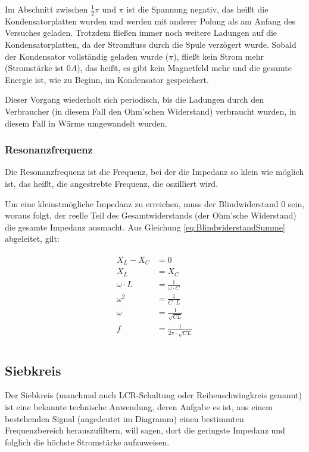 Im Abschnitt zwischen $\frac{1}{2}\pi$ und $\pi$ ist die Spannung negativ, das heißt die Kondensatorplatten wurden und werden mit anderer Polung als am Anfang des Versuches geladen. Trotzdem fließen immer noch weitere Ladungen auf die Kondensatorplatten, da der Stromfluss durch die Spule verzögert wurde. Sobald der Kondensator vollständig geladen wurde ($\pi$), fließt kein Strom mehr (Stromstärke ist $0A$), das heißt, es gibt kein Magnetfeld mehr und die gesamte Energie ist, wie zu Beginn, im Kondensator gespeichert.

Dieser Vorgang wiederholt sich periodisch, bis die Ladungen durch den Verbraucher (in diesem Fall den Ohm'schen Widerstand) verbraucht wurden, in diesem Fall in Wärme umgewandelt wurden.

\subsubsection{Resonanzfrequenz}

Die Resonanzfrequenz ist die Frequenz, bei der die Impedanz so klein wie möglich ist, das heißt, die angestrebte Frequenz, die oszilliert wird.

Um eine kleinstmögliche Impedanz zu erreichen, muss der Blindwiderstand $0$ sein, woraus folgt, der reelle Teil des Gesamtwiderstands (der Ohm'sche Widerstand) die gesamte Impedanz ausmacht. Aus Gleichung \ref{eq:BlindwiderstandSumme} abgeleitet, gilt:

\begin{align}	\label{eq:ResonanzfrequenzSchwingkreis}
\begin{split}
	X_L - X_C &= 0 \\
	X_L &= X_C \\
	\omega \cdot L &= \frac{1}{\omega \cdot C} \\
	\omega ^2 &= \frac{1}{C \cdot L} \\
	\omega &= \frac{1}{\sqrt{C L}} \\	
	f &= \frac{1}{2 \pi \cdot \sqrt{C L}} \\
\end{split}
\end{align}


\subsection{Siebkreis} \label{subsec:Siebkreis}

Der Siebkreis (manchmal auch LCR-Schaltung oder Reihenschwingkreis genannt) ist eine bekannte technische Anwendung, deren Aufgabe es ist, aus einem bestehenden Signal (angedeutet im Diagramm) einen bestimmten Frequenzbereich \glqq herauszufiltern\grqq , will sagen, dort die geringste Impedanz und folglich die höchste Stromstärke aufzuweisen.

